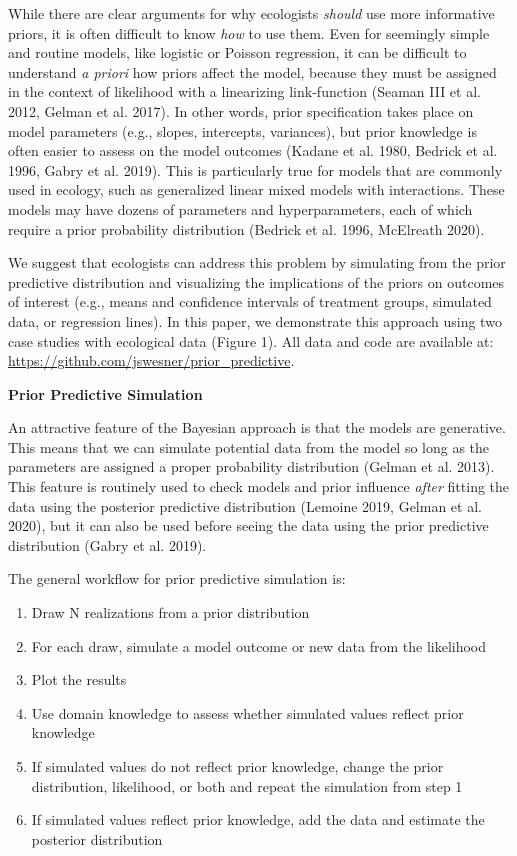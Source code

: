 \documentclass[
  12pt,
]{article}
\begin{document}
While there are clear arguments for why ecologists \emph{should} use
more informative priors, it is often difficult to know \emph{how} to use
them. Even for seemingly simple and routine models, like logistic or
Poisson regression, it can be difficult to understand \emph{a priori}
how priors affect the model, because they must be assigned in the
context of likelihood with a linearizing link-function (Seaman III et
al. 2012, Gelman et al. 2017). In other words, prior specification takes
place on model parameters (e.g., slopes, intercepts, variances), but
prior knowledge is often easier to assess on the model outcomes (Kadane
et al. 1980, Bedrick et al. 1996, Gabry et al. 2019). This is
particularly true for models that are commonly used in ecology, such as
generalized linear mixed models with interactions. These models may have
dozens of parameters and hyperparameters, each of which require a prior
probability distribution (Bedrick et al. 1996, McElreath 2020).

We suggest that ecologists can address this problem by simulating from
the prior predictive distribution and visualizing the implications of
the priors on outcomes of interest (e.g., means and confidence intervals
of treatment groups, simulated data, or regression lines). In this
paper, we demonstrate this approach using two case studies with
ecological data (Figure 1). All data and code are available at:
\url{https://github.com/jswesner/prior_predictive}.

\textbf{Prior Predictive Simulation}

An attractive feature of the Bayesian approach is that the models are
generative. This means that we can simulate potential data from the
model so long as the parameters are assigned a proper probability
distribution (Gelman et al. 2013). This feature is routinely used to
check models and prior influence \emph{after} fitting the data using the
posterior predictive distribution (Lemoine 2019, Gelman et al. 2020),
but it can also be used before seeing the data using the prior
predictive distribution (Gabry et al. 2019).

The general workflow for prior predictive simulation is:

\begin{enumerate}
\def\labelenumi{\arabic{enumi})}
\item
  Draw N realizations from a prior distribution
\item
  For each draw, simulate a model outcome or new data from the
  likelihood
\item
  Plot the results
\item
  Use domain knowledge to assess whether simulated values reflect prior
  knowledge
\item
  If simulated values do not reflect prior knowledge, change the prior
  distribution, likelihood, or both and repeat the simulation from step
  1
\item
  If simulated values reflect prior knowledge, add the data and estimate
  the posterior distribution
\end{enumerate}
\end{document}
